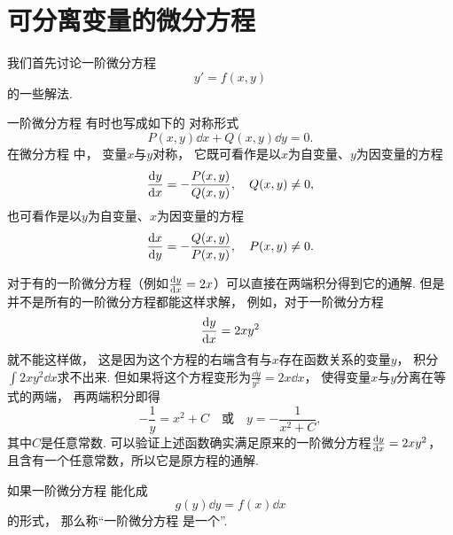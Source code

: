\section{可分离变量的微分方程}
我们首先讨论一阶微分方程\begin{equation}\label{equation:微分方程.一阶微分方程的一般形式}
	y' = f(x,y)
\end{equation}的一些解法.

一阶微分方程  有时也写成如下的
对称形式\begin{equation}\label{equation:微分方程.一阶微分方程的对称形式}
	P(x,y) \dd{x} + Q(x,y) \dd{y} = 0.
\end{equation}
在微分方程  中，
变量\(x\)与\(y\)对称，
它既可看作是以\(x\)为自变量、\(y\)为因变量的方程\begin{equation*}
	\dv{y}{x} = -\frac{P(x,y)}{Q(x,y)},
	\quad Q(x,y)\neq0,
\end{equation*}
也可看作是以\(y\)为自变量、\(x\)为因变量的方程\begin{equation*}
	\dv{x}{y} = -\frac{Q(x,y)}{P(x,y)},
	\quad P(x,y)\neq0.
\end{equation*}

对于有的一阶微分方程（例如\(\dv{y}{x} = 2x\)）可以直接在两端积分得到它的通解.
但是并不是所有的一阶微分方程都能这样求解，
例如，对于一阶微分方程\begin{equation*}
	\dv{y}{x} = 2xy^2
\end{equation*}就不能这样做，
这是因为这个方程的右端含有与\(x\)存在函数关系的变量\(y\)，
积分\(\int 2xy^2 \dd{x}\)求不出来.
但如果将这个方程变形为\(\frac{\dd{y}}{y^2}=2x\dd{x}\)，
使得变量\(x\)与\(y\)分离在等式的两端，
再两端积分即得\begin{equation*}
	-\frac{1}{y} = x^2+C
	\quad\text{或}\quad
	y = -\frac{1}{x^2+C},
\end{equation*}
其中\(C\)是任意常数.
可以验证上述函数确实满足原来的一阶微分方程\(\dv{y}{x} = 2xy^2\)，
且含有一个任意常数，所以它是原方程的通解.

\begin{definition}
如果一阶微分方程 
能化成\begin{equation}\label{equation:微分方程.一阶微分方程的分离变量形式}
	g(y) \dd{y} = f(x) \dd{x}
\end{equation}的形式，
那么称“一阶微分方程 
是一个”.
\end{definition}

